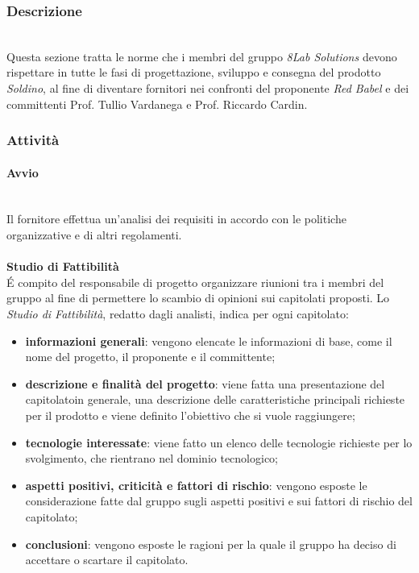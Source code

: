 	\subsubsection{Descrizione} \mbox{}\\ 
		\noindent Questa sezione tratta le norme che i membri del gruppo \textit{8Lab Solutions} 
		devono rispettare in tutte le fasi di progettazione, sviluppo e consegna del 
		prodotto \textit{Soldino}, al fine di diventare fornitori nei confronti del 
		proponente \textit{Red Babel} e dei committenti Prof. Tullio Vardanega e Prof. 
		Riccardo Cardin.

	\subsubsection{Attività}
		\paragraph{Avvio} \mbox{}\\
		Il fornitore effettua un'analisi dei requisiti in accordo con le politiche 
		organizzative e di altri regolamenti. \\ \\
			\textbf{Studio di Fattibilità} \mbox{}\\ 

			\noindent \'E compito del responsabile di progetto organizzare riunioni tra i membri del 
			gruppo al fine di permettere lo scambio di opinioni sui capitolati proposti.
			Lo \textit{Studio di Fattibilità}, redatto dagli analisti, indica per ogni 
			capitolato\glo:
				\begin{itemize}
					\item \textbf{informazioni generali}: vengono elencate le informazioni di 
						base, come il nome del progetto, il proponente e il committente;
					\item \textbf{descrizione e finalità del progetto}: viene fatta una 
						presentazione del capitolato\glosp in generale, una descrizione delle 
						caratteristiche principali richieste per il prodotto e viene definito 
						l'obiettivo che si vuole raggiungere;
					\item \textbf{tecnologie interessate}: viene fatto un elenco delle tecnologie 
						richieste per lo svolgimento, che rientrano nel dominio tecnologico;
					\item \textbf{aspetti positivi, criticità e fattori di rischio}: vengono 
						esposte le considerazione fatte dal gruppo sugli aspetti positivi e sui fattori 
						di rischio del capitolato\glo;
					\item \textbf{conclusioni}: vengono esposte le ragioni per la quale il gruppo 
						ha deciso di accettare o scartare il capitolato\glo.
				\end{itemize}
